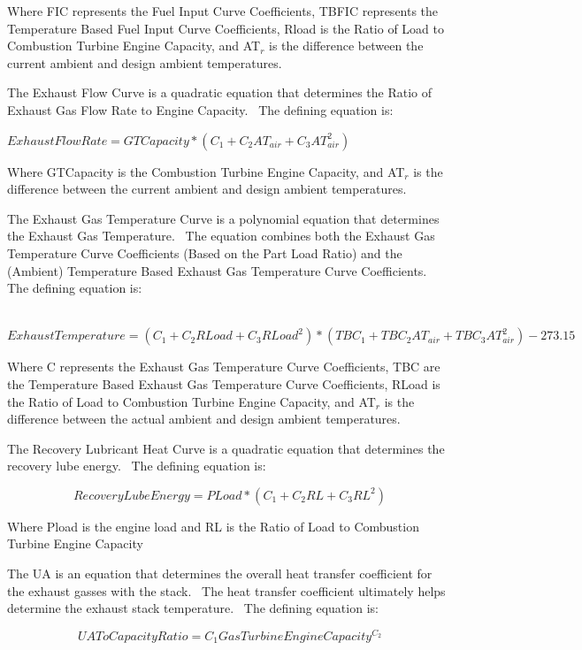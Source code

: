 Where FIC represents the Fuel Input Curve Coefficients, TBFIC represents the Temperature Based Fuel Input Curve Coefficients, Rload is the Ratio of Load to Combustion Turbine Engine Capacity, and AT\(_{r}\) is the difference between the current ambient and design ambient temperatures.

The Exhaust Flow Curve is a quadratic equation that determines the Ratio of Exhaust Gas Flow Rate to Engine Capacity.~ The defining equation is:

\emph{\(ExhaustFlowRate = GTCapacity * ({C_1} + {C_2}A{T_{air}} + {C_3}AT_{air}^2)\) ~}

Where GTCapacity is the Combustion Turbine Engine Capacity, and AT\(_{r}\) is the difference between the current ambient and design ambient temperatures.

The Exhaust Gas Temperature Curve is a polynomial equation that determines the Exhaust Gas Temperature.~ The equation combines both the Exhaust Gas Temperature Curve Coefficients (Based on the Part Load Ratio) and the (Ambient) Temperature Based Exhaust Gas Temperature Curve Coefficients.~ The defining equation is:

~\(ExhaustTemperature = ({C_1} + {C_2}RLoad + {C_3}RLoa{d^2}) * (TB{C_1} + TB{C_2}A{T_{air}} + TB{C_3}AT_{air}^2) - 273.15\)

Where C represents the Exhaust Gas Temperature Curve Coefficients, TBC are the Temperature Based Exhaust Gas Temperature Curve Coefficients, RLoad is the Ratio of Load to Combustion Turbine Engine Capacity, and AT\(_{r}\) is the difference between the actual ambient and design ambient temperatures.

The Recovery Lubricant Heat Curve is a quadratic equation that determines the recovery lube energy.~ The defining equation is:

\begin{equation}
RecoveryLubeEnergy = PLoad * ({C_1} + {C_2}RL + {C_3}R{L^2})
\end{equation}

Where Pload is the engine load and RL is the Ratio of Load to Combustion Turbine Engine Capacity

The UA is an equation that determines the overall heat transfer coefficient for the exhaust gasses with the stack.~ The heat transfer coefficient ultimately helps determine the exhaust stack temperature.~ The defining equation is:

\begin{equation}
UAToCapacityRatio = {C_1}GasTurbineEngineCapacit{y^{{C_2}}}
\end{equation}

